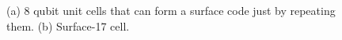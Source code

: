 \documentclass[11pt]{article}
\begin{document}
\begin{figure}[h!]
\centerline{
}
\caption{(a) 8 qubit unit cells that can form a surface code just by repeating them. (b) Surface-17 cell.}
\label{Surface17}
\end{figure}
\end{document}
